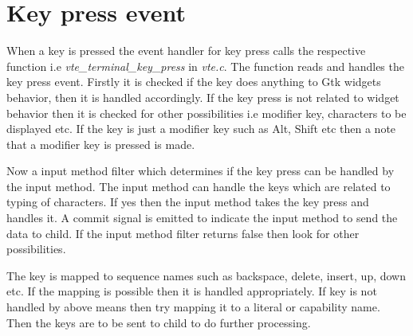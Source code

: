 \section{Key press event}
When a key is pressed the event handler for key press calls the respective function i.e \textit{vte\_terminal\_key\_press} in \textit{vte.c}. The function reads and handles the key press event. Firstly it is checked if the key does anything to Gtk widgets behavior, then it is handled accordingly. If the key press is not related to widget behavior then it is checked for other possibilities i.e modifier key, characters to be displayed etc. If the key is just a  modifier key such as Alt, Shift etc then a note that a modifier key is pressed is made.

Now a input method filter which determines if the key press can be handled by the input method. The input method can handle the keys which are related to typing of characters. If yes then the input method takes the key press and handles it. A commit signal is emitted to indicate the input method to send the data to child. If the input method filter returns false then look for other possibilities.

The key is mapped to sequence names such as backspace, delete, insert, up, down  etc. If the mapping is possible then it is handled appropriately. If key is not handled by above means then try mapping it to a literal or capability name. Then the keys are to be sent to child to do further processing.